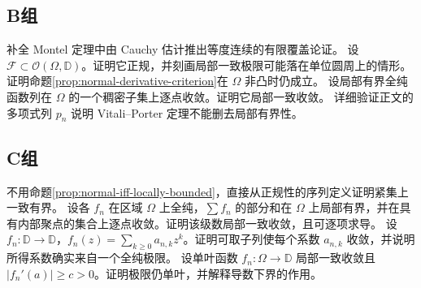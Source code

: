 \subsection*{B组}
\begin{enumerate}[label=\textbf{\thechapter.\arabic*.},resume]
补全 Montel 定理中由 Cauchy 估计推出等度连续的有限覆盖论证。
设 $\mathcal F\subset\mathcal O(\Omega,\mathbb D)$。证明它正规，并刻画局部一致极限可能落在单位圆周上的情形。
证明命题\ref{prop:normal-derivative-criterion}在 $\Omega$ 非凸时仍成立。
设局部有界全纯函数列在 $\Omega$ 的一个稠密子集上逐点收敛。证明它局部一致收敛。
详细验证正文的多项式列 $p_n$ 说明 Vitali--Porter 定理不能删去局部有界性。
\end{enumerate}

\subsection*{C组}
\begin{enumerate}[label=\textbf{\thechapter.\arabic*.},resume]
不用命题\ref{prop:normal-iff-locally-bounded}，直接从正规性的序列定义证明紧集上一致有界。
设各 $f_n$ 在区域 $\Omega$ 上全纯，$\sum f_n$ 的部分和在 $\Omega$ 上局部有界，并在具有内部聚点的集合上逐点收敛。证明该级数局部一致收敛，且可逐项求导。
设 $f_n:\mathbb D\to\mathbb D$，$f_n(z)=\sum_{k\ge0}a_{n,k}z^k$。证明可取子列使每个系数 $a_{n,k}$ 收敛，并说明所得系数确实来自一个全纯极限。
设单叶函数 $f_n:\Omega\to\mathbb D$ 局部一致收敛且 $|f_n'(a)|\ge c>0$。证明极限仍单叶，并解释导数下界的作用。
\end{enumerate}
